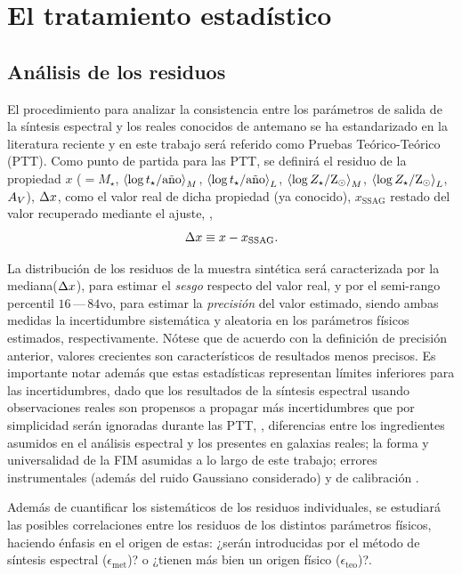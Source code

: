 \section{El tratamiento estadístico}

\subsection{Análisis de los residuos}

El procedimiento para analizar la consistencia entre los parámetros de salida de la síntesis
espectral y los reales conocidos de antemano se ha estandarizado en la literatura reciente
\citep[\eg,][]{Lee2009, Wuyts2009, Pforr2012, Mitchell2013, Magris2015} y en este trabajo será
referido como Pruebas Teórico-Teórico (PTT). Como punto de partida para las PTT, se definirá el
residuo de la propiedad $x$ ($=M_\star$, $\mwla$, $\lwla$, $\mwlz$, $\lwlz$, $\extv$), $\res{x}$,
como el valor real de dicha propiedad (ya conocido), $x_\text{SSAG}$ restado del valor recuperado
mediante el ajuste, \ie,
%
\begin{equation}\label{ec:residual}
\res{x} \equiv x - x_\text{SSAG}.
\end{equation}

La distribución de los residuos de la muestra sintética será caracterizada por la
mediana($\res{x}$), para estimar el \emph{sesgo} respecto del valor real, y por el semi-rango
percentil $16\,$---$\,84$vo, para estimar la \emph{precisión} del valor estimado, siendo ambas
medidas la incertidumbre sistemática y aleatoria en los parámetros físicos estimados,
respectivamente. Nótese que de acuerdo con la definición de precisión anterior, valores crecientes
son característicos de resultados menos precisos. Es importante notar además que estas estadísticas
representan límites inferiores para las incertidumbres, dado que los resultados de la síntesis
espectral usando observaciones reales son propensos a propagar más incertidumbres que por
simplicidad serán ignoradas durante las PTT, \eg, diferencias entre los ingredientes asumidos en el
análisis espectral y los presentes en galaxias reales; la forma y universalidad de la FIM asumidas a
lo largo de este trabajo; errores instrumentales (además del ruido Gaussiano considerado) y de
calibración \citep[véase][para una revisión más detallada]{Conroy2009, Conroy2010a}.

Además de cuantificar los sistemáticos de los residuos individuales, se estudiará las posibles
correlaciones entre los residuos de los distintos parámetros físicos, haciendo énfasis en el origen
de estas: ¿serán introducidas por el método de síntesis espectral ($\epsilon_\text{met}$)? o ¿tienen
más bien un origen físico ($\epsilon_\text{teo}$)?.

